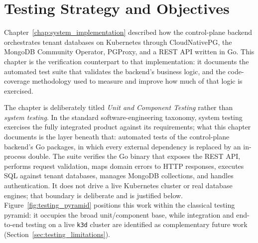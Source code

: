 \section{Testing Strategy and Objectives}
\label{sec:testing_strategy}

Chapter~\ref{chap:system_implementation} described how the control-plane backend orchestrates tenant databases on Kubernetes through CloudNativePG, the MongoDB Community Operator, PGProxy, and a REST API written in Go. This chapter is the verification counterpart to that implementation: it documents the automated test suite that validates the backend's business logic, and the code-coverage methodology used to measure and improve how much of that logic is exercised.

The chapter is deliberately titled \emph{Unit and Component Testing} rather than \emph{system testing}. In the standard software-engineering taxonomy, system testing exercises the fully integrated product against its requirements; what this chapter documents is the layer beneath that: automated tests of the control-plane backend's Go packages, in which every external dependency is replaced by an in-process double. The suite verifies the Go binary that exposes the REST API, performs request validation, maps domain errors to HTTP responses, executes SQL against tenant databases, manages MongoDB collections, and handles authentication. It does not drive a live Kubernetes cluster or real database engines; that boundary is deliberate and is justified below. Figure~\ref{fig:testing_pyramid} positions this work within the classical testing pyramid: it occupies the broad unit/component base, while integration and end-to-end testing on a live \texttt{k3d} cluster are identified as complementary future work (Section~\ref{sec:testing_limitations}).

